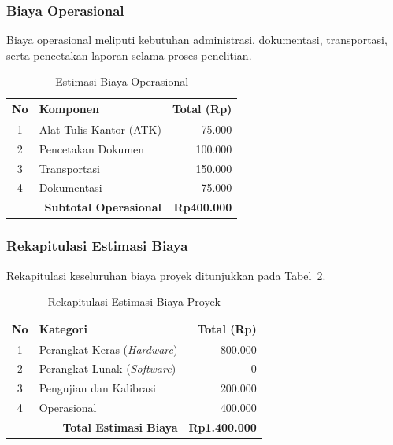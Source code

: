 \documentclass{elsinta}
\begin{document}

\subsubsection{Biaya Operasional}

Biaya operasional meliputi kebutuhan administrasi, dokumentasi, transportasi, serta pencetakan laporan selama proses penelitian.

\begin{table}[H]
\centering
\caption{Estimasi Biaya Operasional}
\label{tab:operasional}

\begin{tabular}{|c|p{8cm}|r|}
\hline
\textbf{No} &
\centering\textbf{Komponen} &
\textbf{Total (Rp)}\\
\hline

1 & Alat Tulis Kantor (ATK) & 75.000\\
\hline
2 & Pencetakan Dokumen & 100.000\\
\hline
3 & Transportasi & 150.000\\
\hline
4 & Dokumentasi & 75.000\\
\hline

\multicolumn{2}{|r|}{\textbf{Subtotal Operasional}} &
\textbf{Rp400.000}\\
\hline

\end{tabular}
\end{table}


\subsubsection{Rekapitulasi Estimasi Biaya}

Rekapitulasi keseluruhan biaya proyek ditunjukkan pada Tabel~\ref{tab:rekap_biaya}.

\begin{table}[H]
\centering
\caption{Rekapitulasi Estimasi Biaya Proyek}
\label{tab:rekap_biaya}

\begin{tabular}{|c|p{8cm}|r|}
\hline
\textbf{No} &
\centering\textbf{Kategori} &
\textbf{Total (Rp)}\\
\hline

1 & Perangkat Keras (\textit{Hardware}) & 800.000\\
\hline
2 & Perangkat Lunak (\textit{Software}) & 0\\
\hline
3 & Pengujian dan Kalibrasi & 200.000\\
\hline
4 & Operasional & 400.000\\
\hline

\multicolumn{2}{|r|}{\textbf{Total Estimasi Biaya}} &
\textbf{Rp1.400.000}\\
\hline

\end{tabular}
\end{table}
\end{document}

